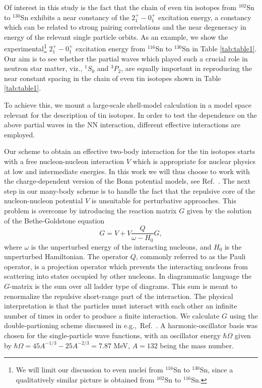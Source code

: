 \documentclass{ws-p9-75x6-50}
\begin{document}
Of interest in this study is the fact that 
the chain of even tin isotopes from $^{102}$Sn to $^{130}$Sn 
exhibits a near constancy of the 
$2^+_1-0^+_1$ excitation energy, a constancy which can be related
to strong pairing correlations and the near degeneracy in energy 
of the relevant single particle orbits. As an example, we show the 
experimental\footnote{We will limit our discussion to even nuclei
from  $^{116}$Sn to $^{130}$Sn, since a qualitatively similar picture
is obtained from $^{102}$Sn to $^{116}$Sn.}
$2^+_1-0^+_1$ excitation energy 
from  $^{116}$Sn to $^{130}$Sn in Table \ref{tab:table1}. 
Our aim is to see whether the partial waves which played such a crucial
role in neutron star matter, viz., $^1S_0$ and $^3P_2$, are equally
important in reproducing the near constant spacing in the chain
of even tin isotopes shown in  Table \ref{tab:table1}. 

To achieve this, we mount a large-scale shell-model calculation in 
a model space relevant for the description of tin isotopes. 
In order to test the dependence on the above partial waves in
the NN interaction, different effective interactions are employed.
 
Our scheme to obtain an effective two-body interaction for 
the tin isotopes
starts with a free nucleon-nucleon  interaction $V$ which is
appropriate for nuclear physics at low and intermediate energies. 
In this work we will thus choose to work with the charge-dependent
version of the Bonn potential models, see \mbox{Ref. \cite{cdbonn}}.
The next step 
in our many-body scheme is to handle 
the fact that the repulsive core of the nucleon-nucleon potential $V$
is unsuitable for perturbative approaches. This problem is overcome
by introducing the reaction matrix $G$ given by the solution of the
Bethe-Goldstone equation
%
\begin{equation}
    G=V+V\frac{Q}{\omega - H_0}G,
\end{equation}
%
where $\omega$ is the unperturbed energy of the interacting nucleons,
and $H_0$ is the unperturbed Hamiltonian. 
The operator $Q$, commonly referred to
as the Pauli operator, is a projection operator which prevents the
interacting nucleons from scattering into states occupied by other nucleons.
In diagrammatic language 
the $G$-matrix is the sum over all
ladder type of diagrams. This sum is meant to renormalize
the repulsive short-range part of the interaction. The physical interpretation
is that the particles must interact with each other an infinite number
of times in order to produce a finite interaction. 
We calculate $G$ using the double-partioning scheme discussed
in e.g.,~\mbox{Ref. \cite{hko95}}.
A harmonic-oscillator basis was chosen for the
single-particle
wave functions, with an oscillator energy $\hbar\Omega$ given
by
$\hbar\Omega = 45A^{-1/3} - 25A^{-2/3}=7.87 $ MeV,  $A=132$ being the mass
number.
\end{document}
